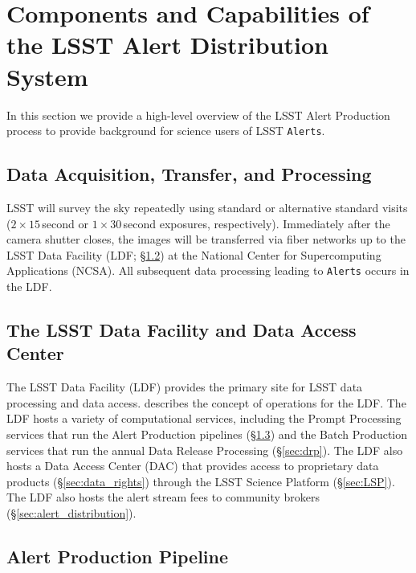 \section{Components and Capabilities of the LSST Alert Distribution System}\label{sec:components}

In this section we provide a high-level overview of the LSST Alert Production process to provide background for science users of LSST \texttt{Alerts}.

\subsection{Data Acquisition, Transfer, and Processing}

LSST will survey the sky repeatedly using standard or alternative standard visits ($2\times15$\,second or $1\times30$\,second exposures, respectively).  
Immediately after the camera shutter closes, the images will be transferred via fiber networks up to the LSST Data Facility (LDF; \S \ref{sec:LDF}) at the National Center for Supercomputing Applications (NCSA).
All subsequent data processing leading to \texttt{Alerts} occurs in the LDF.

\subsection{The LSST Data Facility and Data Access Center} \label{sec:LDF}

The LSST Data Facility (LDF) provides the primary site for LSST data processing and data access.
 describes the concept of operations for the LDF.
The LDF hosts a variety of computational services, including the Prompt Processing services that run the Alert Production pipelines (\S \ref{sec:AP}) and the Batch Production services that run the annual Data Release Processing (\S \ref{sec:drp}). 
The LDF also hosts a Data Access Center (DAC) that provides access to proprietary data products (\S \ref{sec:data_rights}) through the LSST Science Platform (\S \ref{sec:LSP}).
The LDF also hosts the alert stream fees to community brokers (\S \ref{sec:alert_distribution}).

\subsection{Alert Production Pipeline}\label{sec:AP}

